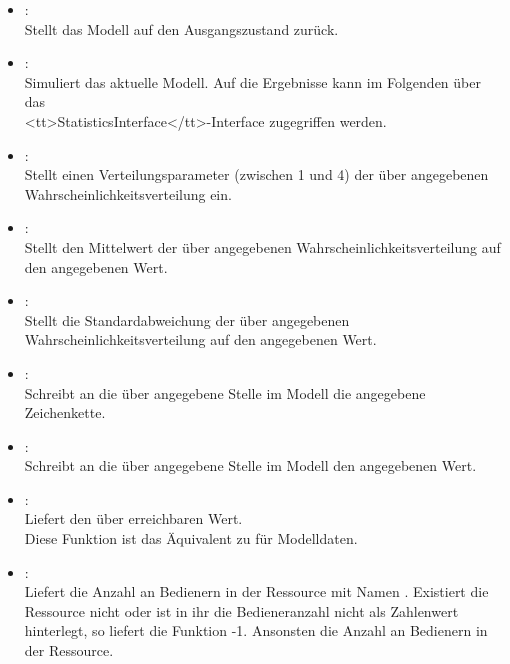 \begin{itemize}

\item
{}:\\
Stellt das Modell auf den Ausgangszustand zurück.

\item
{}:\\
Simuliert das aktuelle Modell.
Auf die Ergebnisse kann im Folgenden über das\\
<tt>StatisticsInterface</tt>-Interface zugegriffen werden.

\item
{}:\\
Stellt einen Verteilungsparameter  (zwischen 1 und 4) der über 
angegebenen Wahrscheinlichkeitsverteilung ein.

\item
{}:\\
Stellt den Mittelwert der über  angegebenen Wahrscheinlichkeitsverteilung auf den angegebenen Wert.

\item
{}:\\
Stellt die Standardabweichung der über  angegebenen Wahrscheinlichkeitsverteilung auf den angegebenen Wert.

\item
{}:\\
Schreibt an die über  angegebene Stelle im Modell die angegebene Zeichenkette.

\item
{}:\\
Schreibt an die über  angegebene Stelle im Modell den angegebenen Wert.

\item
{}:\\
Liefert den über  erreichbaren Wert.\\
Diese Funktion ist das Äquivalent zu  für Modelldaten.

\item
{}:\\
Liefert die Anzahl an Bedienern in der Ressource mit Namen .
Existiert die Ressource nicht oder ist in ihr die Bedieneranzahl nicht als Zahlenwert
hinterlegt, so liefert die Funktion -1. Ansonsten die Anzahl an Bedienern in der
Ressource.


\end{itemize}
